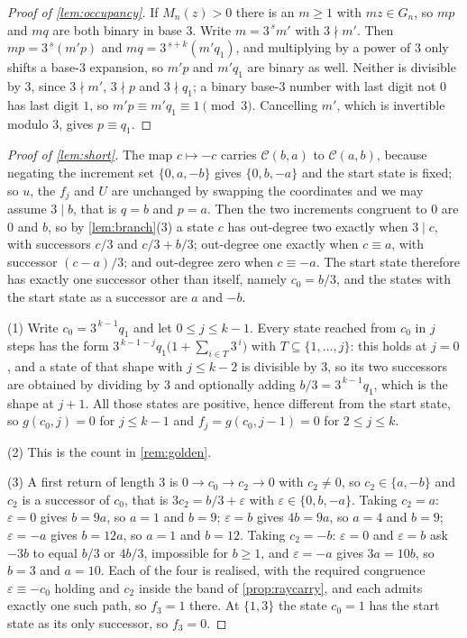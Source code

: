 \documentclass[11pt]{amsart}
\theoremstyle{definition}
\theoremstyle{remark}
\begin{document}
\begin{proof}[Proof of \cref{lem:occupancy}]
If $M_n(z)>0$ there is an $m\ge 1$ with $mz\in G_n$, so $mp$ and $mq$ are both binary in base $3$. Write $m=3^{\,s}m'$ with $3\nmid m'$. Then $mp=3^{\,s}(m'p)$ and $mq=3^{\,s+k}(m'q_1)$, and multiplying by a power of $3$ only shifts a base-$3$ expansion, so $m'p$ and $m'q_1$ are binary as well. Neither is divisible by $3$, since $3\nmid m'$, $3\nmid p$ and $3\nmid q_1$; a binary base-$3$ number with last digit not $0$ has last digit $1$, so $m'p\equiv m'q_1\equiv 1\pmod 3$. Cancelling $m'$, which is invertible modulo $3$, gives $p\equiv q_1$.
\end{proof}

\begin{proof}[Proof of \cref{lem:short}]
The map $c\mapsto-c$ carries $\mathcal{C}(b,a)$ to $\mathcal{C}(a,b)$, because negating the increment set $\{0,a,-b\}$ gives $\{0,b,-a\}$ and the start state is fixed; so $u$, the $f_j$ and $U$ are unchanged by swapping the coordinates and we may assume $3\mid b$, that is $q=b$ and $p=a$. Then the two increments congruent to $0$ are $0$ and $b$, so by \cref{lem:branch}(3) a state $c$ has out-degree two exactly when $3\mid c$, with successors $c/3$ and $c/3+b/3$; out-degree one exactly when $c\equiv a$, with successor $(c-a)/3$; and out-degree zero when $c\equiv-a$. The start state therefore has exactly one successor other than itself, namely $c_0=b/3$, and the states with the start state as a successor are $a$ and $-b$.

(1) Write $c_0=3^{\,k-1}q_1$ and let $0\le j\le k-1$. Every state reached from $c_0$ in $j$ steps has the form $3^{\,k-1-j}q_1\bigl(1+\sum_{i\in T}3^{\,i}\bigr)$ with $T\subseteq\{1,\dots,j\}$: this holds at $j=0$, and a state of that shape with $j\le k-2$ is divisible by $3$, so its two successors are obtained by dividing by $3$ and optionally adding $b/3=3^{\,k-1}q_1$, which is the shape at $j+1$. All those states are positive, hence different from the start state, so $g(c_0,j)=0$ for $j\le k-1$ and $f_j=g(c_0,j-1)=0$ for $2\le j\le k$.

(2) This is the count in \cref{rem:golden}.

(3) A first return of length $3$ is $0\to c_0\to c_2\to 0$ with $c_2\neq 0$, so $c_2\in\{a,-b\}$ and $c_2$ is a successor of $c_0$, that is $3c_2=b/3+\varepsilon$ with $\varepsilon\in\{0,b,-a\}$. Taking $c_2=a$: $\varepsilon=0$ gives $b=9a$, so $a=1$ and $b=9$; $\varepsilon=b$ gives $4b=9a$, so $a=4$ and $b=9$; $\varepsilon=-a$ gives $b=12a$, so $a=1$ and $b=12$. Taking $c_2=-b$: $\varepsilon=0$ and $\varepsilon=b$ ask $-3b$ to equal $b/3$ or $4b/3$, impossible for $b\ge 1$, and $\varepsilon=-a$ gives $3a=10b$, so $b=3$ and $a=10$. Each of the four is realised, with the required congruence $\varepsilon\equiv-c_0$ holding and $c_2$ inside the band of \cref{prop:raycarry}, and each admits exactly one such path, so $f_3=1$ there. At $\{1,3\}$ the state $c_0=1$ has the start state as its only successor, so $f_3=0$.


\end{proof}
\end{document}

